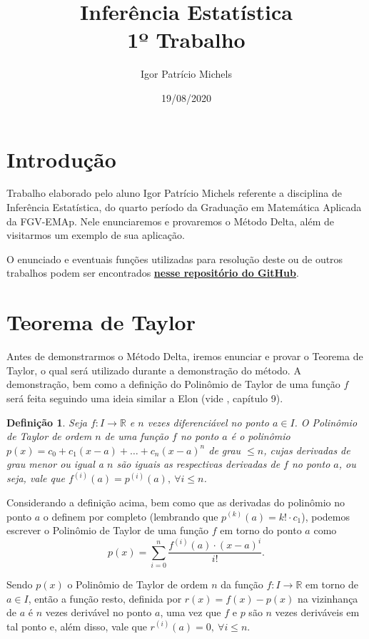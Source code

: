 \documentclass{article}
\title{Inferência Estatística \\ 1º Trabalho}
\author{Igor Patrício Michels}
\date{19/08/2020}
\newtheorem{definition}{Definição}
\begin{document}
\maketitle

\section*{Introdução}

Trabalho elaborado pelo aluno Igor Patrício Michels referente a disciplina de Inferência Estatística, do quarto período da Graduação em Matemática Aplicada da FGV-EMAp. Nele enunciaremos e provaremos o Método Delta, além de visitarmos um exemplo de sua aplicação.

O enunciado e eventuais funções utilizadas para resolução deste ou de outros trabalhos podem ser encontrados \href{https://github.com/IgorMichels/Statistical_Inference}{\textbf{nesse repositório do GitHub}}.

\section*{Teorema de Taylor}

Antes de demonstrarmos o Método Delta, iremos enunciar e provar o Teorema de Taylor, o qual será utilizado durante a demonstração do método. A demonstração, bem como a definição do Polinômio de Taylor de uma função $f$ será feita seguindo uma ideia similar a Elon (vide \cite{elon}, capítulo 9).

\begin{definition}
    Seja $f : I \to \mathbb{R}$ e $n$ vezes diferenciável no ponto $a \in I$. O Polinômio de Taylor de ordem $n$ de uma função $f$ no ponto $a$ é o polinômio $p(x) = c_0 + c_1(x - a) + \dots + c_n(x - a)^n$ de grau $\leq n$, cujas derivadas de grau menor ou igual a $n$ são iguais as respectivas derivadas de $f$ no ponto $a$, ou seja, vale que $f^{(i)}(a) = p^{(i)}(a), ~\forall i\leq n$.
\end{definition}

Considerando a definição acima, bem como que as derivadas do polinômio no ponto $a$ o definem por completo (lembrando que $p^(k)(a) = k!\cdot c_1$), podemos escrever o Polinômio de Taylor de uma função $f$ em torno do ponto $a$ como
\[p(x) = \sum_{i = 0}^{n} \dfrac{f^{(i)}(a)\cdot (x - a)^i}{i!}.\]

Sendo $p(x)$ o Polinômio de Taylor de ordem $n$ da função $f : I \to \mathbb{R}$ em torno de $a \in I$, então a função resto, definida por $r(x) = f(x) - p(x)$ na vizinhança de $a$ é $n$ vezes derivável no ponto $a$, uma vez que $f$ e $p$ são $n$ vezes deriváveis em tal ponto e, além disso, vale que $r^{(i)}(a) = 0, ~\forall i \leq n$.
\end{document}
